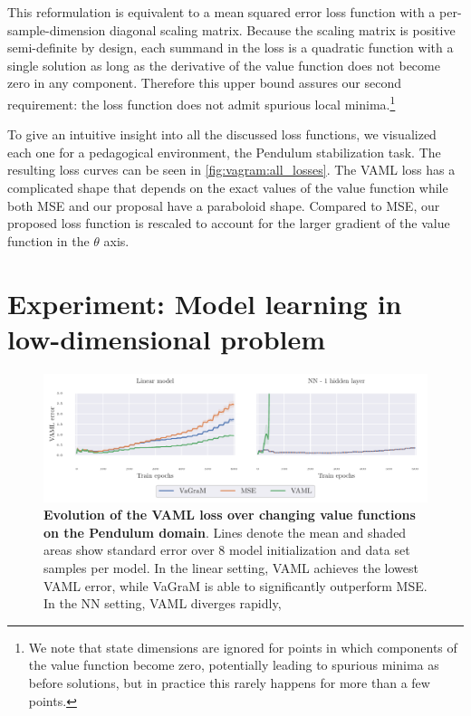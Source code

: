 This reformulation is equivalent to a mean squared error loss function with a per-sample-dimension diagonal scaling matrix.
Because the scaling matrix is positive semi-definite by design, each summand in the loss is a quadratic function with a single solution as long as the derivative of the value function does not become zero in any component.
Therefore this upper bound assures our second requirement: the loss function does not admit spurious local minima.\footnote{We note that state dimensions are ignored for points in which components of the value function become zero, potentially leading to spurious minima as before solutions, but in practice this rarely happens for more than a few points.}

To give an intuitive insight into all the discussed loss functions, we visualized each one for a pedagogical environment, the Pendulum stabilization task.
The resulting loss curves can be seen in \autoref{fig:vagram:all_losses}.
The VAML loss has a complicated shape that depends on the exact values of the value function while both MSE and our proposal have a paraboloid shape.
Compared to MSE, our proposed loss function is rescaled to account for the larger gradient of the value function in the $\theta$ axis.

\section{Experiment: Model learning in low-dimensional problem}
\label{sec:vagram:experiments}

\begin{figure}[t]
\begin{center}
\includegraphics[width=\linewidth]{figures/vagram/pendulum_joint.pdf}
\end{center}
\caption{\textbf{Evolution of the VAML loss over changing value functions on the Pendulum domain}. Lines denote the mean and shaded areas show standard error over 8 model initialization and data set samples per model. In the linear setting, VAML achieves the lowest VAML error, while VaGraM is able to significantly outperform MSE. In the NN setting, VAML diverges rapidly, }
\label{fig:vagram:iterated_pendulum_training}
\end{figure}

